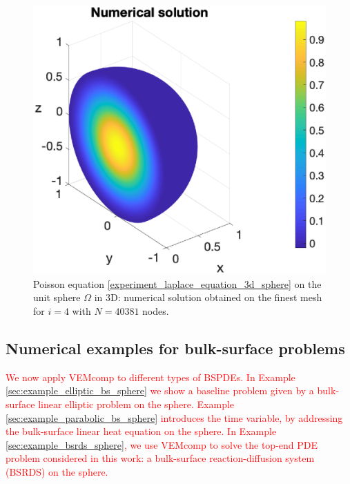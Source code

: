 \documentclass[a4paper]{article}
\newcommand{\red}[1]{\textcolor{red}{#1}}
\begin{document}
\begin{figure}[H]
\begin{center}
\includegraphics[scale=0.5]{laplace3dsphere_Nx41.eps}
\end{center}
\caption{Poisson equation \eqref{experiment_laplace_equation_3d_sphere} on the unit sphere $\Omega$ in 3D: numerical solution obtained on the finest mesh for $i=4$ with $N= 40381$ nodes.}
\label{fig:laplace_3d_numsol_sphere}
\end{figure} 

\subsection{Numerical examples for bulk-surface problems}
\red{We now apply VEMcomp to different types of BSPDEs.  In Example \ref{sec:example_elliptic_bs_sphere} we show a baseline problem given by a bulk-surface linear elliptic problem on the sphere. Example \ref{sec:example_parabolic_bs_sphere} introduces the time variable, by addressing the bulk-surface linear heat equation on the sphere.  In Example \ref{sec:example_bsrds_sphere}, we use VEMcomp to solve the top-end PDE problem considered in this work: a bulk-surface reaction-diffusion system (BSRDS) on the sphere.}
\end{document}
